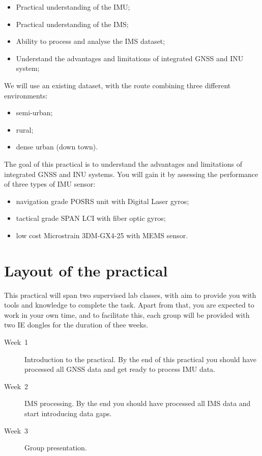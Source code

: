 \documentclass[british]{book}
\begin{document}
\begin{itemize}
	\item Practical understanding of the IMU;
	\item Practical understanding of the IMS;
	\item Ability to process and analyse the IMS dataset;
	\item Understand the advantages and limitations of integrated GNSS and INU system;

\end{itemize}

We will use an existing dataset, with the route combining three different environments:

\begin{itemize}
	\item semi-urban;
	\item rural;
	\item dense urban (down town).
\end{itemize}

The goal of this practical is to understand the advantages and limitations of integrated GNSS and INU systems. You will gain it by assessing the performance of three types of IMU sensor:

\begin{itemize}
	\item navigation grade POSRS unit with Digital Laser gyros;
	\item tactical grade SPAN LCI with fiber optic gyros;
	\item low cost Microstrain 3DM-GX4-25 with MEMS sensor.
\end{itemize}


\section{Layout of the practical}

This practical will span two supervised lab classes, with aim to provide you with tools and knowledge to complete the task. Apart from that, you are expected to work in your own time, and to facilitate this, each group will be provided with two IE dongles for the duration of thee weeks.

\begin{description}
	\item [{Week~1}] Introduction to the practical. By the end of this practical you should
	have processed all GNSS data and get ready to process IMU data.
	\item [{Week~2}] IMS processing. By the end you should have processed
	all IMS data and start introducing data gaps.
	\item [{Week~3}] Group presentation.
\end{description}
\end{document}
